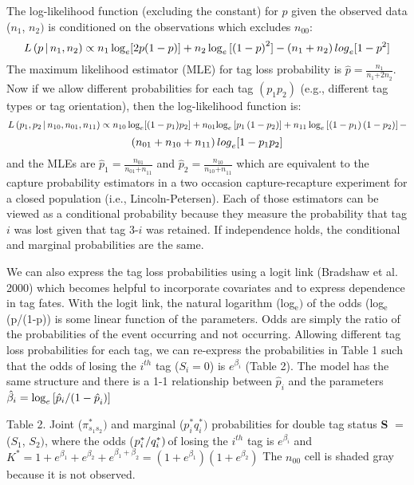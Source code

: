 \documentclass{article}
\begin{document}
The log-likelihood function (excluding the constant) for $p$ given the observed 
data ($n_{\mathrm{1}}$, $n_{\mathrm{2}})$ is conditioned on the observations 
which excludes $n_{00}:$
\[
L\left( p\thinspace\vert\thinspace {n_{1},n_{2}}\right) \propto n_{1}\log 
_{e}[2{p(1-p)}]+n_{2}\log_{e}{[\left( 1-p 
\right)^{2}]}-(n_{1}+n_{2})\thinspace {log}_{e}{[1-p^{2}]}
\]
The maximum likelihood estimator (MLE) for tag loss probability is 
$\hat{p}=\frac{n_{1}}{n_{1}{+2n}_{2}}$. Now if we allow different 
probabilities for each tag $(p_{1}p_{2})$ (e.g., different tag types or tag 
orientation), then the log-likelihood function is:
\[
L\left( {p_{1},p_{2}}\thinspace\vert\thinspace {n_{10},n_{01},n_{11}}\right) 
\propto n_{10}\log_{e}[(1-p_{1})p_{2}]+n_{01}{\mathrm{log}}_{e}\left[ 
p_{1}\left( 1-p_{2} \right) \right]+n_{11}\log_{e}\left[ \left( 1-p_{1} 
\right)\left( 1-p_{2} \right) \right]-
\]
\[
(n_{01}+n_{10}+n_{11})\thinspace {log}_{e}{[1-p_{1}p_{2}]}
\]
and the MLEs are $\hat{p}_{1}=\frac{n_{01}}{n_{01}{+n}_{11}}$ and 
$\hat{p}_{2}=\frac{n_{10}}{n_{10}{+n}_{11}}$ which are equivalent to the 
capture probability estimators in a two occasion capture-recapture 
experiment for a closed population (i.e., Lincoln-Petersen). Each of those 
estimators can be viewed as a conditional probability because they measure 
the probability that tag $i$ was lost given that tag 3-$i$ was retained. If 
independence holds, the conditional and marginal probabilities are the same. 

We can also express the tag loss probabilities using a logit link (Bradshaw 
et al. 2000) which becomes helpful to incorporate covariates and to express 
dependence in tag fates. With the logit link, the natural logarithm 
(log$_{\mathrm{e}})$ of the odds (log$_{\mathrm{e}}$(p/(1-p)) is some linear 
function of the parameters. Odds are simply the ratio of the probabilities 
of the event occurring and not occurring. Allowing different tag loss 
probabilities for each tag, we can re-express the probabilities in Table 1 
such that the odds of losing the $i^{th}$ tag ($S_{i}=$0) is $e^{\beta 
_{i}}$ (Table 2). The model has the same structure and there is a 1-1 
relationship between $\hat{p}_{i}$ and the parameters $\hat{\beta }_{i}=\log 
_{e}{[\hat{p}_{i}} \mathord{\left/ {\vphantom {{[\hat{p}_{i}} 
{{(1-\hat{p}}_{i})]}}} \right. \kern-\nulldelimiterspace} 
{{(1-\hat{p}}_{i})]}$

Table 2. Joint ($\pi_{s_{1}s_{2}}^{\ast })$ and marginal ($p_{i}^{\ast 
}q_{i}^{\ast })$ probabilities for double tag status \textbf{S} $=$ 
($S_{\mathrm{1}}$, $S_{\mathrm{2}})$, where the odds ($p_{i}^{\ast 
}/q_{i}^{\ast })\thinspace $of losing the $i^{th}$ tag is $e^{\beta_{i}}$ 
and $K^{\ast }=1+e^{\beta_{1}}+e^{\beta_{2}}+e^{{\beta_{1}+\beta 
}_{2}}=(1+e^{\beta_{1}})(1+e^{\beta_{2}})$ The $n_{00}$ cell is shaded gray 
because it is not observed. 
\end{document}
